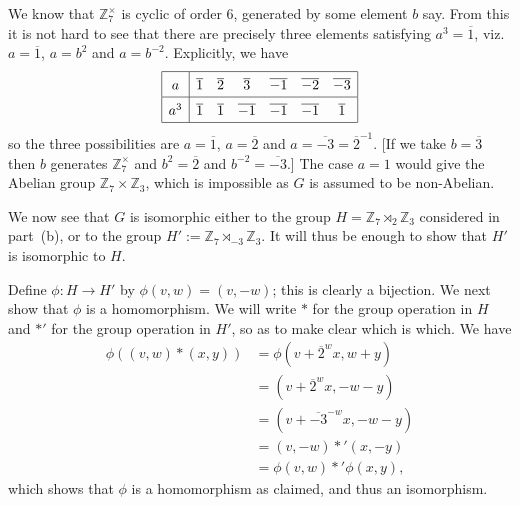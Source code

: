 \documentclass{amsart}
\newcommand{\xra}{\xrightarrow}
\renewcommand{\:}{\colon}
\newcommand{\ov}{\overline}
\newcommand{\tm}{\times}
\newcommand{\Z}{\mathbb{Z}}
\theoremstyle{definition}
\newenvironment{solution}{{\noindent\bf Solution:}}{}
\begin{document}
\begin{solution}
\begin{itemize}
  We know that $\Z_7^\tm$ is cyclic of order $6$, generated by some
  element $b$ say.  From this it is not hard to see that there are
  precisely three elements satisfying $a^3=\ov{1}$, viz. $a=\ov{1}$,
  $a=b^2$ and $a=b^{-2}$.  Explicitly, we have
  \[ \renewcommand{\arraystretch}{1.5}
   \begin{array}{|c|cccccc|} \hline
   a   & \ov{ 1} & \ov{ 2} & \ov{ 3} & \ov{-1} & \ov{-2} & \ov{-3}
    \\ \hline
   a^3 & \ov{ 1} & \ov{ 1} & \ov{-1} & \ov{-1} & \ov{-1} & \ov{ 1}
    \\ \hline
  \end{array} \]
  so the three possibilities are $a=\ov{1}$, $a=\ov{2}$ and
  $a=\ov{-3}=\ov{2}^{-1}$.  [If we take $b=\ov{3}$ then $b$ generates
  $\Z_7^\tm$ and $b^2=\ov{2}$ and $b^{-2}=\ov{-3}$.]  The case $a=1$
  would give the Abelian group $\Z_7\tm\Z_3$, which is impossible as
  $G$ is assumed to be non-Abelian.

  We now see that $G$ is isomorphic either to the group
  $H=\Z_7\rtimes_2\Z_3$ considered in part~(b), or to the group
  $H':=\Z_7\rtimes_{-3}\Z_3$.  It will thus be enough to show that $H'$
  is isomorphic to $H$.

  Define $\phi\:H\xra{}H'$ by $\phi(v,w)=(v,-w)$; this is clearly a
  bijection.  We next show that $\phi$ is a homomorphism.  We will
  write $*$ for the group operation in $H$ and $*'$ for the group
  operation in $H'$, so as to make clear which is which.  We have
  \begin{align*}
   \phi((v,w)*(x,y)) &= \phi(v+\ov{2}^wx,w+y) \\
    &= (v+\ov{2}^wx,-w-y) \\
    &= (v+\ov{-3}^{-w}x,-w-y) \\
    &= (v,-w)*'(x,-y) \\
    &= \phi(v,w)*'\phi(x,y),
  \end{align*}
  which shows that $\phi$ is a homomorphism as claimed, and thus an
  isomorphism.  
 \end{itemize}
\end{solution}
\end{document}
